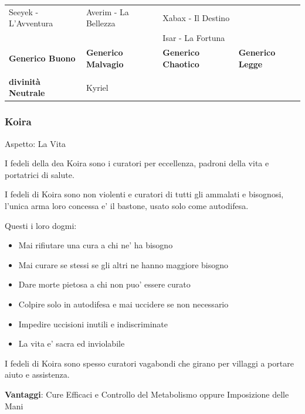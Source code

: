 \documentclass[a4paper,11pt,twoside,openany]{book}
\begin{document}
\begin{longtable}[]{@{}llll@{}}
\begin{minipage}[t]{0.22\columnwidth}
		Seeyek - L'Avventura\strut
	\end{minipage} & \begin{minipage}[t]{0.22\columnwidth}\raggedright
		Averim - La Bellezza\strut
	\end{minipage} & \begin{minipage}[t]{0.22\columnwidth}\raggedright
		Xabax - Il Destino\strut
	\end{minipage} & \begin{minipage}[t]{0.22\columnwidth}\raggedright
		\strut
	\end{minipage}\tabularnewline
	& & Isar - La Fortuna &\tabularnewline
	\textbf{Generico Buono} & \textbf{Generico Malvagio} & \textbf{Generico Chaotico} & \textbf{Generico Legge}\tabularnewline
	\tabularnewline
	\textbf{divinità Neutrale} & Kyriel  &\tabularnewline
	\bottomrule
\end{longtable}

\pagebreak

\subsubsection{Koira}

Aspetto: La Vita
\bigskip


I fedeli della dea Koira sono i curatori per eccellenza, padroni della vita e portatrici di salute.

I fedeli di Koira sono non violenti e curatori di tutti gli ammalati e bisognosi, l'unica arma loro concessa e' il bastone, usato solo come autodifesa.

Questi i loro dogmi:

\begin{itemize}
	\item Mai rifiutare una cura a chi ne' ha bisogno
	\item Mai curare se stessi se gli altri ne hanno maggiore bisogno
	\item Dare morte pietosa a chi non puo' essere curato
	\item Colpire solo in autodifesa e mai uccidere se non necessario
	\item Impedire uccisioni inutili e indiscriminate
	\item La vita e' sacra ed inviolabile
\end{itemize}


I fedeli di Koira sono spesso curatori vagabondi che girano per villaggi a portare aiuto e assistenza.


\textbf{Vantaggi}: Cure Efficaci e Controllo del Metabolismo oppure Imposizione delle Mani 
\end{document}
